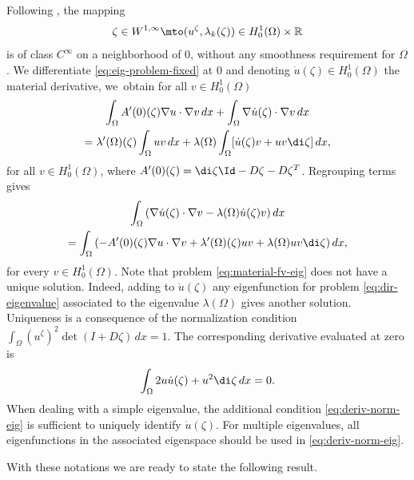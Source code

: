 Following \cite[Th.\,5.7.4 ]{henrot-pierre-english}, the mapping
\[
\zeta \in W^{1,\infty} \mto (u^\zeta, \lambda_k(\zeta)) \in H_0^1(\Omega)\times \Bbb{R}
\]
is of class $C^\infty$ on a neighborhood of $0$, without any smoothness requirement for $\Omega$. We differentiate \eqref{eq:eig-problem-fixed} at $0$ and denoting $\dot u(\zeta) \in H_0^1(\Omega)$ the material derivative, we~obtain for all $v \in H_0^1(\Omega)$
\vspace*{-5pt}
\begin{multline*}
\int_\Omega A'(0)(\zeta)\nabla u \cdot \nabla v \, dx +\int_\Omega \nabla \dot u(\zeta)\cdot \nabla v \, dx \\
= \lambda'(\Omega)(\zeta) \int_\Omega uv\, dx +\lambda(\Omega)\int_\Omega [\dot u(\zeta)v +uv\di \zeta]\, dx,
\end{multline*}
for all $v \in H_0^1(\Omega)$, where $A'(0)(\zeta) = \di \zeta \Id - D\zeta-D\zeta^T$. Regrouping terms gives
\vspace*{-5pt}
\begin{multline}
\int_\Omega \left(\nabla \dot u(\zeta)\cdot \nabla v -\lambda(\Omega) \dot u(\zeta)v\right)dx \\
= \int_\Omega\left(- A'(0)(\zeta)\nabla u \cdot \nabla v + \lambda'(\Omega)(\zeta) uv+\lambda(\Omega) uv\di \zeta\right) dx,
\label{eq:material-fv-eig}
\end{multline}
for every $v \in H_0^1(\Omega)$.
Note that problem \eqref{eq:material-fv-eig} does not have a unique solution. Indeed, adding to $\dot u(\zeta)$ any eigenfunction for problem \eqref{eq:dir-eigenvalue} associated to the eigenvalue $\lambda(\Omega)$ gives another solution. Uniqueness is a consequence of the normalization condition $\int_\Omega (u^\zeta)^2 \det(I+D\zeta)\, dx=1$. The corresponding derivative evaluated at zero is
\begin{equation}
\int_\Omega 2u\dot u(\zeta)+u^2 \di \zeta \, dx = 0.
\label{eq:deriv-norm-eig}
\end{equation}
When dealing with a simple eigenvalue, the additional condition \eqref{eq:deriv-norm-eig} is sufficient to uniquely identify $\dot u(\zeta)$. For multiple eigenvalues, all eigenfunctions in the associated eigenspace should be used in \eqref{eq:deriv-norm-eig}.

With these notations we are ready to state the following result.

